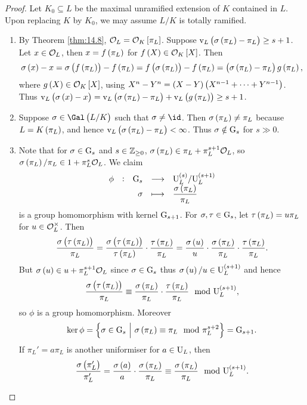 \begin{proof}
Let $ K_0 \subseteq L $ be the maximal unramified extension of $ K $ contained in $ L $. Upon replacing $ K $ by $ K_0 $, we may assume $ L / K $ is totally ramified.
\begin{enumerate}
\item By Theorem \ref{thm:14.8}, $ \OOO_L = \OOO_K\sbr{\pi_L} $. Suppose $ \v_L\br{\sigma\br{\pi_L} - \pi_L} \ge s + 1 $. Let $ x \in \mathcal{O}_L $, then $ x = f\br{\pi_L} $ for $ f\br{X} \in \OOO_K\sbr{X} $. Then
$$ \sigma\br{x} - x = \sigma\br{f\br{\pi_L}} - f\br{\pi_L} = f\br{\sigma\br{\pi_L}} - f\br{\pi_L} = \br{\sigma\br{\pi_L} - \pi_L}g\br{\pi_L}, $$
where $ g\br{X} \in \OOO_K\sbr{X} $, using $ X^n - Y^n = \br{X - Y}\br{X^{n - 1} + \dots + Y^{n - 1}} $. Thus $ \v_L\br{\sigma\br{x} - x} = \v_L\br{\sigma\br{\pi_L} - \pi_L} + \v_L\br{g\br{\pi_L}} \ge s + 1 $.
\item Suppose $ \sigma \in \Gal\br{L / K} $ such that $ \sigma \ne \id $. Then $ \sigma\br{\pi_L} \ne \pi_L $ because $ L = K\br{\pi_L} $, and hence $ \v_L\br{\sigma\br{\pi_L} - \pi_L} < \infty $. Thus $ \sigma \notin \mathrm{G}_s $ for $ s \gg 0 $.

\pagebreak

\item Note that for $ \sigma \in \mathrm{G}_s $ and $ s \in \mathbb{Z}_{\ge 0} $, $ \sigma\br{\pi_L} \in \pi_L + \pi_L^{s + 1}\OOO_L $, so $ \sigma\br{\pi_L} / \pi_L \in 1 + \pi_L^s\OOO_L $. We claim
$$ \function[\phi]{\G_s}{\U_L^{\br{s}} / \U_L^{\br{s + 1}}}{\sigma}{\dfrac{\sigma\br{\pi_L}}{\pi_L}} $$
is a group homomorphism with kernel $ \mathrm{G}_{s + 1} $. For $ \sigma, \tau \in \mathrm{G}_s $, let $ \tau\br{\pi_L} = u\pi_L $ for $ u \in \mathcal{O}_L^\times $. Then
$$ \dfrac{\sigma\br{\tau\br{\pi_L}}}{\pi_L} = \dfrac{\sigma\br{\tau\br{\pi_L}}}{\tau\br{\pi_L}} \cdot \dfrac{\tau\br{\pi_L}}{\pi_L} = \dfrac{\sigma\br{u}}{u} \cdot \dfrac{\sigma\br{\pi_L}}{\pi_L} \cdot \dfrac{\tau\br{\pi_L}}{\pi_L}. $$
But $ \sigma\br{u} \in u + \pi_L^{s + 1}\OOO_L $ since $ \sigma \in \mathrm{G}_s $ thus $ \sigma\br{u} / u \in \U_L^{\br{s + 1}} $ and hence
$$ \dfrac{\sigma\br{\tau\br{\pi_L}}}{\pi_L} \equiv \dfrac{\sigma\br{\pi_L}}{\pi_L} \cdot \dfrac{\tau\br{\pi_L}}{\pi_L} \mod \U_L^{\br{s + 1}}, $$
so $ \phi $ is a group homomorphism. Moreover
$$ \ker \phi = \cbr{\sigma \in \G_s \st \sigma\br{\pi_L} \equiv \pi_L \mod \pi_L^{s + 2}} = \G_{s + 1}. $$
If $ \pi_L' = a\pi_L $ is another uniformiser for $ a \in \mathrm{U}_L $, then
$$ \dfrac{\sigma\br{\pi_L'}}{\pi_L'} = \dfrac{\sigma\br{a}}{a} \cdot \dfrac{\sigma\br{\pi_L}}{\pi_L} \equiv \dfrac{\sigma\br{\pi_L}}{\pi_L} \mod \U_L^{\br{s + 1}}. $$
\end{enumerate}
\end{proof}

